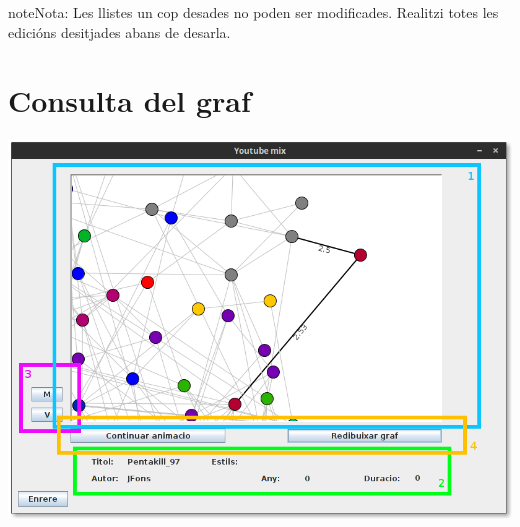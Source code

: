 \documentclass[letterpaper,10pt,oneside]{sphinxmanual}
\begin{document}
\begin{notice}{note}{Nota:}
Les llistes un cop desades no poden ser modificades. Realitzi totes les edicións desitjades abans de desarla.
\end{notice}


\section{Consulta del graf}
\label{gen_llistes:consulta-del-graf}
\includegraphics{consult_graf.png}
\end{document}
